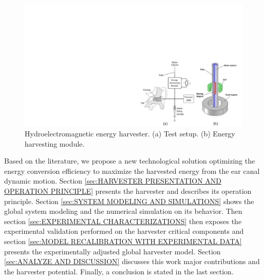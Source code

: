 \documentclass[3p,twocolumn,preprint]{elsarticle}
\begin{document}
\begin{figure}[!htbp]
	\centering
	\captionsetup{justification=centering}
	\includegraphics[trim={18cm 0cm 0cm 8.75cm},clip, width=\linewidth]{figures/critias_emag.pdf}
	\caption{Hydroelectromagnetic energy harvester. (a) Test setup. (b) Energy harvesting module. \cite{Delnavaz2012}} 
	\label{fig:critias_emag}
\end{figure}
\begin{table}[!htbp]
	\centering
	\captionsetup{justification=centering}
	\caption{Existing harvesters exploiting the ear canal deformation energy}
	\label{tab:harvesters_ear}
\end{table}
Based on the literature, we propose a new technological solution optimizing the energy conversion efficiency to maximize the harvested energy from the ear canal dynamic motion. Section \ref{sec:HARVESTER PRESENTATION AND OPERATION PRINCIPLE} presents the harvester and describes its operation principle. Section \ref{sec:SYSTEM MODELING AND SIMULATIONS} shows the global system  modeling and the numerical simulation on its behavior. Then section \ref{sec:EXPERIMENTAL CHARACTERIZATIONS} then exposes the experimental validation performed on the harvester critical components and section \ref{sec:MODEL RECALIBRATION WITH EXPERIMENTAL DATA} presents the experimentally adjusted global harvester model. Section \ref{sec:ANALYZE AND DISCUSSION} discusses this work major contributions and the harvester potential. Finally, a conclusion is stated in the last section.
\end{document}
